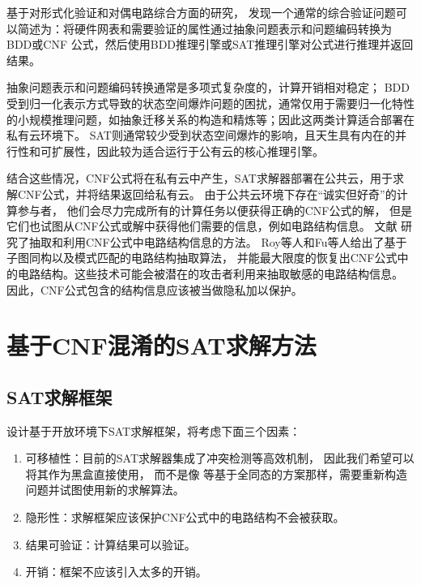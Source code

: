 基于对形式化验证和对偶电路综合方面的研究，
发现一个通常的综合验证问题可以简述为：将硬件网表和需要验证的属性通过抽象问题表示和问题编码转换为BDD或CNF 公式，然后使用BDD推理引擎或SAT推理引擎对公式进行推理并返回结果。

抽象问题表示和问题编码转换通常是多项式复杂度的，计算开销相对稳定；
BDD受到归一化表示方式导致的状态空间爆炸问题的困扰，通常仅用于需要归一化特性的小规模推理问题，如抽象迁移关系的构造和精炼等；因此这两类计算适合部署在私有云环境下。
SAT则通常较少受到状态空间爆炸的影响，且天生具有内在的并行性和可扩展性，因此较为适合运行于公有云的核心推理引擎。

结合这些情况，CNF公式将在私有云中产生，SAT求解器部署在公共云，用于求解CNF公式，并将结果返回给私有云。
由于公共云环境下存在“诚实但好奇”的计算参与者，
他们会尽力完成所有的计算任务以便获得正确的CNF公式的解，
但是它们也试图从CNF公式或解中获得他们需要的信息，例如电路结构信息。
文献
研究了抽取和利用CNF公式中电路结构信息的方法。
Roy等人和Fu等人给出了基于子图同构以及模式匹配的电路结构抽取算法，
并能最大限度的恢复出CNF公式中的电路结构。这些技术可能会被潜在的攻击者利用来抽取敏感的电路结构信息。
因此，CNF公式包含的结构信息应该被当做隐私加以保护。

\section{基于CNF混淆的SAT求解方法}

\subsection{SAT求解框架}
设计基于开放环境下SAT求解框架，将考虑下面三个因素：

\begin{enumerate}
 \item 可移植性：目前的SAT求解器集成了冲突检测等高效机制，
 因此我们希望可以将其作为黑盒直接使用，
 而不是像 等基于全同态的方案那样，需要重新构造问题并试图使用新的求解算法。
 \item \label{3:g2} 隐形性：求解框架应该保护CNF公式中的电路结构不会被获取。
\item 结果可验证：计算结果可以验证。
 \item \label{3:g3} 开销：框架不应该引入太多的开销。
\end{enumerate}

